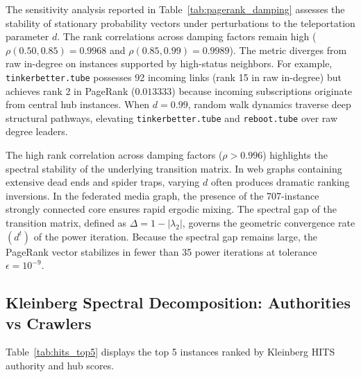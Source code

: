 \documentclass[conference]{IEEEtran}
\begin{document}
The sensitivity analysis reported in Table~\ref{tab:pagerank_damping} assesses the stability of stationary probability vectors under perturbations to the teleportation parameter $d$. The rank correlations across damping factors remain high ($\rho(0.50, 0.85) = 0.9968$ and $\rho(0.85, 0.99) = 0.9989$). The metric diverges from raw in-degree on instances supported by high-status neighbors. For example, \texttt{tinkerbetter.tube} possesses 92 incoming links (rank 15 in raw in-degree) but achieves rank 2 in PageRank ($0.013333$) because incoming subscriptions originate from central hub instances. When $d = 0.99$, random walk dynamics traverse deep structural pathways, elevating \texttt{tinkerbetter.tube} and \texttt{reboot.tube} over raw degree leaders.


The high rank correlation across damping factors ($\rho > 0.996$) highlights the spectral stability of the underlying transition matrix. In web graphs containing extensive dead ends and spider traps, varying $d$ often produces dramatic ranking inversions. In the federated media graph, the presence of the 707-instance strongly connected core ensures rapid ergodic mixing. The spectral gap of the transition matrix, defined as $\Delta = 1 - |\lambda_2|$, governs the geometric convergence rate $(d^t)$ of the power iteration. Because the spectral gap remains large, the PageRank vector stabilizes in fewer than 35 power iterations at tolerance $\epsilon = 10^{-9}$.


\subsection{Kleinberg Spectral Decomposition: Authorities vs Crawlers}

Table~\ref{tab:hits_top5} displays the top 5 instances ranked by Kleinberg HITS authority and hub scores.

\begin{table}[htbp]
\caption{Kleinberg HITS Top-5 Authority and Hub Scores}
\label{tab:hits_top5}
\centering
{}
\end{table}
\end{document}
